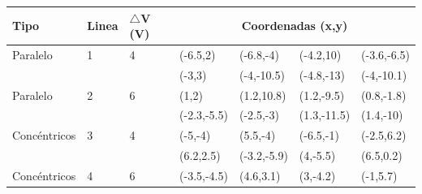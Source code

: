 \documentclass[letterpaper, 12pt]{report}
\begin{document}
\begin{table}[H]
	\begin{center}
		\begin{tabular}{|p{2.5cm}|p{1.3cm}|p{2cm}|p{1.9cm}|p{1.9cm}|p{1.9cm}|p{1.9cm}|}


			Tipo         & Linea & $\triangle$V (V) &
			\multicolumn{4}{c}{Coordenadas (x,y)}                                              \\ \hline


			Paralelo     & 1     & 4                & (-6.5,2)    & (-6.8,-4)   & (-4.2,10)  &
			(-3.6,-6.5)                                                                        \\

			             &
			             &
			             &
			(-3,3)       &
			(-4,-10.5)   &
			(-4.8,-13)   &
			(-4,-10.1)                                                                         \\ \hline


			Paralelo     & 2     & 6                & (1,2)       & (1.2,10.8)  & (1.2,-9.5) &
			(0.8,-1.8)                                                                         \\

			             &
			             &
			             &
			(-2.3,-5.5)  &
			(-2.5,-3)    &
			(1.3,-11.5)  &
			(1.4,-10)                                                                          \\ \hline


			Concéntricos & 3     & 4                & (-5,-4)     & (5.5,-4)    & (-6.5,-1)  &
			(-2.5,6.2)                                                                         \\

			             &
			             &
			             &
			(6.2,2.5)    &
			(-3.2,-5.9)  &
			(4,-5.5)     &
			(6.5,0.2)                                                                          \\ \hline


			Concéntricos & 4     & 6                & (-3.5,-4.5) & (4.6,3.1)   & (3,-4.2)   &
			(-1,5.7)                                                                           \\


\end{tabular}
\end{center}
\end{table}
\end{document}
